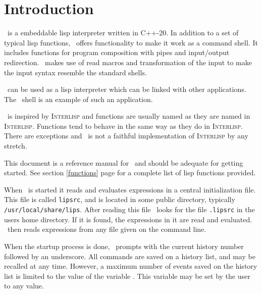 \section{Introduction}
\lips\ is a embeddable lisp interpreter written in \textsf{C++-20}.
In addition to a set of typical lisp functions, \lips\ offers
functionality to make it work as a command shell.  It includes
functions for program composition with pipes and input/output
redirection.  \lips\ makes use of read macros and transformation of
the input to make the input syntax resemble the standard shells.

\lips\ can be used as a lisp interpreter which can be linked with
other applications.  The \lips\ shell is an example of such an
application.

\lips\ is inspired by \textsc{Interlisp} and functions are usually
named as they are named in \textsc{Interlisp}.  Functions tend to
behave in the same way as they do in \textsc{Interlisp}.  There are
exceptions and \lips\ is not a faithful implementation of
\textsc{Interlisp} by any stretch.

This document is a reference manual for \lips\ and should be adequate
for getting started.  See section \ref{functions} page
\pageref{functions} for a complete list of lisp functions provided.

When \lips\ is started it reads and evaluates expressions in a central
initialization file.  This file is called \texttt{lipsrc}, and is
located in some public directory, typically
\texttt{/usr/local/share/lips}.  After reading this file \lips\ looks
for the file \texttt{.lipsrc} in the users home directory.  If it is
found, the expressions in it are read and evaluated. \lips\ then reads
expressions from any file given on the command line.

When the startup process is done, \lips\ prompts with the current
history number followed by an underscore.  All commands are saved on a
history list, and may be recalled at any time.  However, a maximum
number of events saved on the history list is limited to the value of
the variable .  This variable may be set by the user to
any value.
